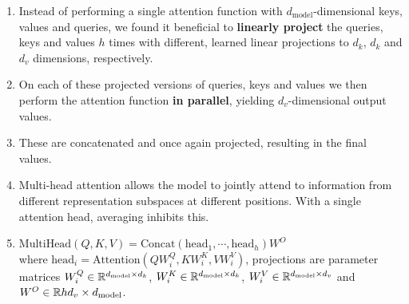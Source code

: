 \begin{enumerate}
    \item Instead of performing a single attention function with $d_{\text{model}}$-dimensional keys, values and queries, we found it beneficial to \textbf{linearly project} the queries, keys and values $h$ times with different, learned linear projections to $d_k$, $d_k$ and $d_v$ dimensions, respectively.
    \hfill \cite{arxiv/1706.03762/Attention-Is-All-You-Need}

    \item On each of these projected versions of queries, keys and values we then perform the attention function \textbf{in parallel}, yielding $d_v $-dimensional output values. 
    \hfill \cite{arxiv/1706.03762/Attention-Is-All-You-Need}
    
    \item These are concatenated and once again projected, resulting in the final values.
    \hfill \cite{arxiv/1706.03762/Attention-Is-All-You-Need}

    \item Multi-head attention allows the model to jointly attend to information from different representation subspaces at different positions. 
    With a single attention head, averaging inhibits this.
    \hfill \cite{arxiv/1706.03762/Attention-Is-All-You-Need}

    \item $ \text{MultiHead}(Q, K, V ) = \text{Concat}(\text{head}_1, \cdots, \text{head}_h)W^O $
    \hfill \cite{arxiv/1706.03762/Attention-Is-All-You-Need}
    \\[0.2cm]
    where $\text{head}_i = \text{Attention}(QW^Q_i , KW^K_i , V W^V_i )$, projections are parameter matrices $W^Q_i \in \mathbb{R}^{d_{\text{model}}\times d_k} $, $W^K_i \in \mathbb{R}^{d_{\text{model}}\times d_k} $, $W^V_ i \in \mathbb{R}^{d_{\text{model}}\times d_v}$ and $W^ O \in \mathbb{R}{hd_v \times d_{\text{model}}} $.
    \hfill \cite{arxiv/1706.03762/Attention-Is-All-You-Need}
\end{enumerate}























